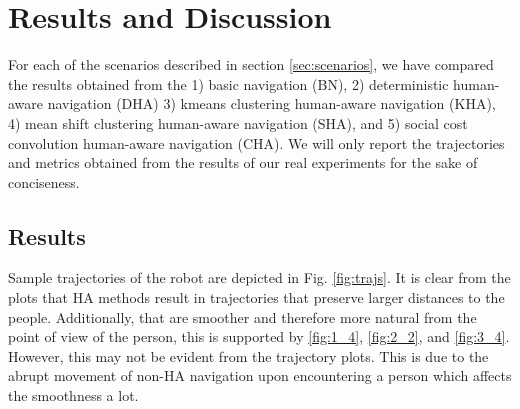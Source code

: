 \section{Results and Discussion}

For each of the scenarios described in section \ref{sec:scenarios}, we have compared the results obtained from the 1) basic navigation (BN), 2) deterministic human-aware navigation (DHA) 3) kmeans clustering human-aware navigation (KHA), 4) mean shift clustering human-aware navigation (SHA), and 5) social cost convolution human-aware navigation (CHA). We will only report the trajectories and metrics obtained from the results of our real experiments for the sake of conciseness.






\subsection{Results}
\label{sec:results}

Sample trajectories of the robot are depicted in Fig. \ref{fig:trajs}. It is clear from the plots that HA methods result in trajectories that preserve larger distances to the people. Additionally, that are smoother and therefore more natural from the point of view of the person, this is supported by \ref{fig:1_4}, \ref{fig:2_2}, and \ref{fig:3_4}. However, this may not be evident from the trajectory plots. This is due to the abrupt movement of non-HA navigation upon encountering a person which affects the smoothness a lot. 

